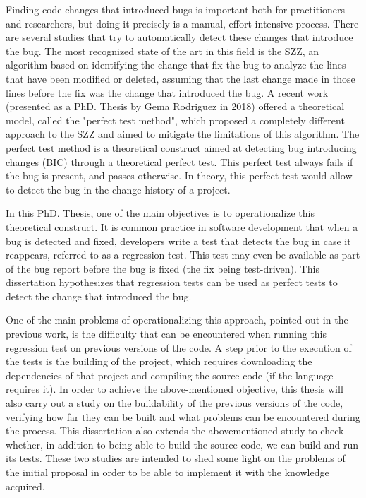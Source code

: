Finding code changes that introduced bugs is important both for practitioners and researchers, but doing it precisely is a manual, effort-intensive process.
There are several studies that try to automatically detect these changes that introduce the bug. 
The most recognized state of the art in this field is the SZZ, an algorithm based on identifying the change that fix the bug to analyze the lines that have been modified or deleted, assuming that the last change made in those lines before the fix was the change that introduced the bug. 
A recent work (presented as a PhD. Thesis by Gema Rodriguez in 2018) offered a theoretical model, called the "perfect test method", which proposed a completely different approach to the SZZ and aimed to mitigate the limitations of this algorithm. 
The perfect test method is a theoretical construct aimed at detecting bug introducing changes (BIC) through a theoretical perfect test. This perfect test always fails if the bug is present, and passes otherwise.
In theory, this perfect test would allow to detect the bug in the change history of a project.

In this PhD. Thesis, one of the main objectives is to operationalize this theoretical construct.
It is common practice in software development that when a bug is detected and fixed, developers write a test that detects the bug in case it reappears, referred to as a regression test. 
This test may even be available as part of the bug report before the bug is fixed (the fix being test-driven). 
This dissertation hypothesizes that regression tests can be used as perfect tests to detect the change that introduced the bug. 

One of the main problems of operationalizing this approach, pointed out in the previous work, is the difficulty that can be encountered when running this regression test on previous versions of the code. 
A step prior to the execution of the tests is the building of the project, which requires downloading the dependencies of that project and compiling the source code (if the language requires it). 
In order to achieve the above-mentioned objective, this thesis will also carry out a study on the buildability of the previous versions of the code, verifying how far they can be built and what problems can be encountered during the process.
This dissertation also extends the abovementioned study to check whether, in addition to being able to build the source code, we can build and run its tests. 
These two studies are intended to shed some light on the problems of the initial proposal in order to be able to implement it with the knowledge acquired.

